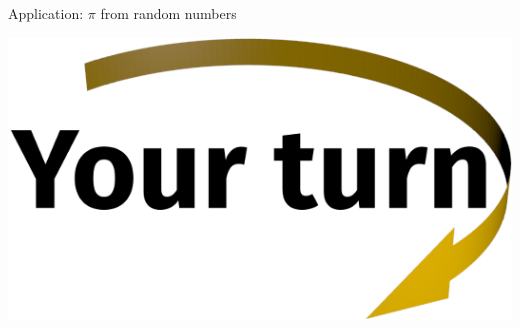 \documentclass[svgnames]{beamer}
\begin{document}
\begin{frame}{Application: $\pi$ from random numbers}
 \vspace{0.3truecm}
 \begin{center}
  \includegraphics[width=3truecm]{yourturn}
 \end{center}
\end{frame}
\end{document}
